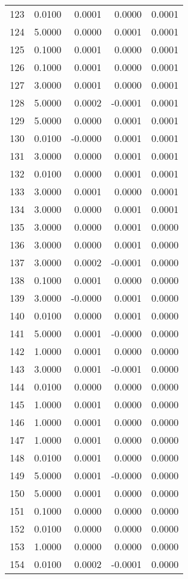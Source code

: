 \begin{longtable}{lrrrr}
123 & 0.0100 & 0.0001 & 0.0000 & 0.0001 \\
124 & 5.0000 & 0.0000 & 0.0001 & 0.0001 \\
125 & 0.1000 & 0.0001 & 0.0000 & 0.0001 \\
126 & 0.1000 & 0.0001 & 0.0000 & 0.0001 \\
127 & 3.0000 & 0.0001 & 0.0000 & 0.0001 \\
128 & 5.0000 & 0.0002 & -0.0001 & 0.0001 \\
129 & 5.0000 & 0.0000 & 0.0001 & 0.0001 \\
130 & 0.0100 & -0.0000 & 0.0001 & 0.0001 \\
131 & 3.0000 & 0.0000 & 0.0001 & 0.0001 \\
132 & 0.0100 & 0.0000 & 0.0001 & 0.0001 \\
133 & 3.0000 & 0.0001 & 0.0000 & 0.0001 \\
134 & 3.0000 & 0.0000 & 0.0001 & 0.0001 \\
135 & 3.0000 & 0.0000 & 0.0001 & 0.0000 \\
136 & 3.0000 & 0.0000 & 0.0001 & 0.0000 \\
137 & 3.0000 & 0.0002 & -0.0001 & 0.0000 \\
138 & 0.1000 & 0.0001 & 0.0000 & 0.0000 \\
139 & 3.0000 & -0.0000 & 0.0001 & 0.0000 \\
140 & 0.0100 & 0.0000 & 0.0001 & 0.0000 \\
141 & 5.0000 & 0.0001 & -0.0000 & 0.0000 \\
142 & 1.0000 & 0.0001 & 0.0000 & 0.0000 \\
143 & 3.0000 & 0.0001 & -0.0001 & 0.0000 \\
144 & 0.0100 & 0.0000 & 0.0000 & 0.0000 \\
145 & 1.0000 & 0.0001 & 0.0000 & 0.0000 \\
146 & 1.0000 & 0.0001 & 0.0000 & 0.0000 \\
147 & 1.0000 & 0.0001 & 0.0000 & 0.0000 \\
148 & 0.0100 & 0.0001 & 0.0000 & 0.0000 \\
149 & 5.0000 & 0.0001 & -0.0000 & 0.0000 \\
150 & 5.0000 & 0.0001 & 0.0000 & 0.0000 \\
151 & 0.1000 & 0.0000 & 0.0000 & 0.0000 \\
152 & 0.0100 & 0.0000 & 0.0000 & 0.0000 \\
153 & 1.0000 & 0.0000 & 0.0000 & 0.0000 \\
154 & 0.0100 & 0.0002 & -0.0001 & 0.0000 \\

\end{longtable}
